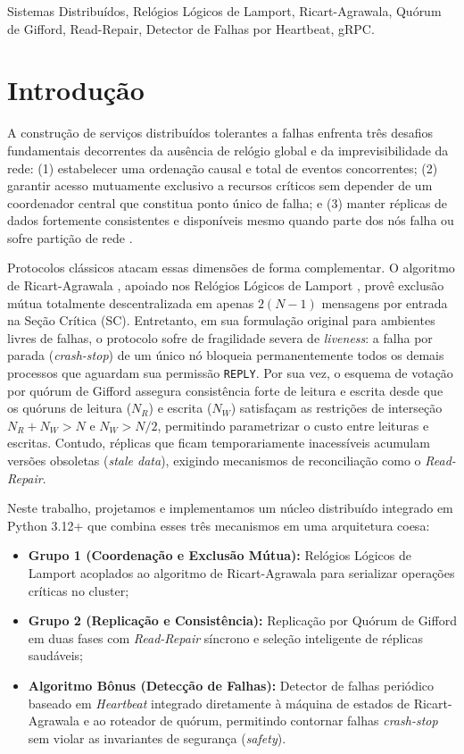 \documentclass[conference,10pt]{IEEEtran}
\begin{document}
\begin{IEEEkeywords}
Sistemas Distribuídos, Relógios Lógicos de Lamport, Ricart-Agrawala, Quórum de Gifford, Read-Repair, Detector de Falhas por Heartbeat, gRPC.
\end{IEEEkeywords}

\section{Introdução}

A construção de serviços distribuídos tolerantes a falhas enfrenta três desafios fundamentais decorrentes da ausência de relógio global e da imprevisibilidade da rede: (1) estabelecer uma ordenação causal e total de eventos concorrentes; (2) garantir acesso mutuamente exclusivo a recursos críticos sem depender de um coordenador central que constitua ponto único de falha; e (3) manter réplicas de dados fortemente consistentes e disponíveis mesmo quando parte dos nós falha ou sofre partição de rede \cite{tanenbaum2023}.

Protocolos clássicos atacam essas dimensões de forma complementar. O algoritmo de Ricart-Agrawala \cite{ricart1981}, apoiado nos Relógios Lógicos de Lamport \cite{lamport1978}, provê exclusão mútua totalmente descentralizada em apenas $2(N-1)$ mensagens por entrada na Seção Crítica (SC). Entretanto, em sua formulação original para ambientes livres de falhas, o protocolo sofre de fragilidade severa de \textit{liveness}: a falha por parada (\textit{crash-stop}) de um único nó bloqueia permanentemente todos os demais processos que aguardam sua permissão \texttt{REPLY}. Por sua vez, o esquema de votação por quórum de Gifford \cite{gifford1979} assegura consistência forte de leitura e escrita desde que os quóruns de leitura ($N_R$) e escrita ($N_W$) satisfaçam as restrições de interseção $N_R + N_W > N$ e $N_W > N/2$, permitindo parametrizar o custo entre leituras e escritas. Contudo, réplicas que ficam temporariamente inacessíveis acumulam versões obsoletas (\textit{stale data}), exigindo mecanismos de reconciliação como o \textit{Read-Repair}.

Neste trabalho, projetamos e implementamos um núcleo distribuído integrado em Python 3.12+ que combina esses três mecanismos em uma arquitetura coesa:
\begin{itemize}
    \item \textbf{Grupo 1 (Coordenação e Exclusão Mútua):} Relógios Lógicos de Lamport acoplados ao algoritmo de Ricart-Agrawala para serializar operações críticas no cluster;
    \item \textbf{Grupo 2 (Replicação e Consistência):} Replicação por Quórum de Gifford em duas fases com \textit{Read-Repair} síncrono e seleção inteligente de réplicas saudáveis;
    \item \textbf{Algoritmo Bônus (Detecção de Falhas):} Detector de falhas periódico baseado em \textit{Heartbeat} \cite{chandra1996} integrado diretamente à máquina de estados de Ricart-Agrawala e ao roteador de quórum, permitindo contornar falhas \textit{crash-stop} sem violar as invariantes de segurança (\textit{safety}).
\end{itemize}
\end{document}
